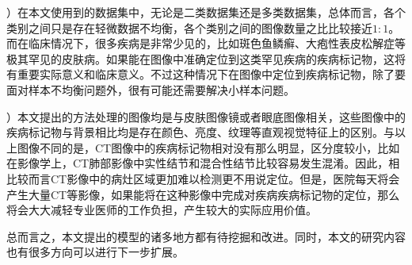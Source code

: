 ）在本文使用到的数据集中，无论是二类数据集还是多类数据集，总体而言，各个类别之间只是存在轻微数据不均衡，各个类别之间的图像数量之比比较接近$1:1$。而在临床情况下，很多疾病是非常少见的，比如斑色鱼鳞癣、大疱性表皮松解症等极其罕见的皮肤病。如果能在图像中准确定位到这类罕见疾病的疾病标记物，这将有重要实际意义和临床意义。不过这种情况下在图像中定位到疾病标记物，除了要面对样本不均衡问题外，很有可能还需要解决小样本问题。

）本文提出的方法处理的图像均是与皮肤图像镜或者眼底图像相关，这些图像中的疾病标记物与背景相比均是存在颜色、亮度、纹理等直观视觉特征上的区别。与以上图像不同的是，CT图像中的疾病标记物相对没有那么明显，区分度较小，比如在影像学上，CT肺部影像中实性结节和混合性结节比较容易发生混淆。因此，相比较而言CT影像中的病灶区域更加难以检测更不用说定位。但是，医院每天将会产生大量CT等影像，如果能将在这种影像中完成对疾病疾病标记物的定位，那么将会大大减轻专业医师的工作负担，产生较大的实际应用价值。

总而言之，本文提出的模型的诸多地方都有待挖掘和改进。同时，本文的研究内容也有很多方向可以进行下一步扩展。
